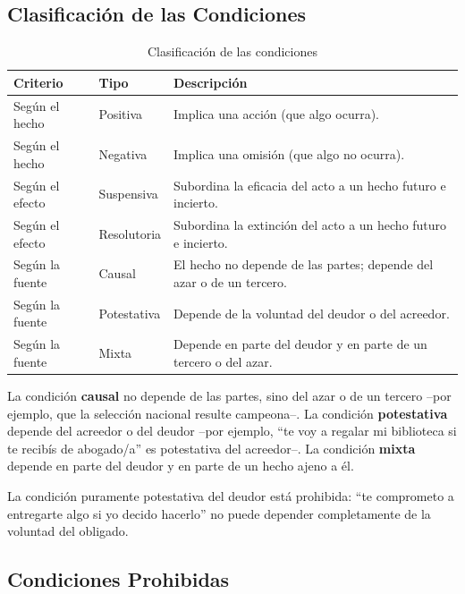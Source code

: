 \documentclass[12pt,oneside]{book}
\begin{document}
\subsection{Clasificación de las Condiciones}

\begin{table}[H]
\centering
\begin{tabularx}{\textwidth}{l l X}
\toprule
\textbf{Criterio} & \textbf{Tipo} & \textbf{Descripción} \\
\midrule
Según el hecho & Positiva & Implica una acción (que algo ocurra). \\
Según el hecho & Negativa & Implica una omisión (que algo no ocurra). \\
Según el efecto & Suspensiva & Subordina la eficacia del acto a un hecho futuro e incierto. \\
Según el efecto & Resolutoria & Subordina la extinción del acto a un hecho futuro e incierto. \\
Según la fuente & Causal & El hecho no depende de las partes; depende del azar o de un tercero. \\
Según la fuente & Potestativa & Depende de la voluntad del deudor o del acreedor. \\
Según la fuente & Mixta & Depende en parte del deudor y en parte de un tercero o del azar. \\
\bottomrule
\end{tabularx}
\caption{Clasificación de las condiciones}
\end{table}

La condición \textbf{causal} no depende de las partes, sino del azar o de un tercero --por ejemplo, que la selección nacional resulte campeona--. La condición \textbf{potestativa} depende del acreedor o del deudor --por ejemplo, ``te voy a regalar mi biblioteca si te recibís de abogado/a'' es potestativa del acreedor--. La condición \textbf{mixta} depende en parte del deudor y en parte de un hecho ajeno a él.

\begin{important}
La condición puramente potestativa del deudor está prohibida: ``te comprometo a entregarte algo si yo decido hacerlo'' no puede depender completamente de la voluntad del obligado.
\end{important}

\subsection{Condiciones Prohibidas}
\end{document}
